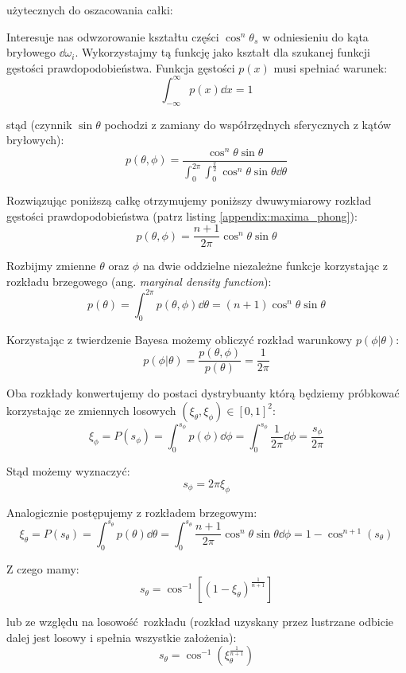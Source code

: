 \documentclass[../main.tex]{subfiles}
\begin{document}
\noindent użytecznych do oszacowania całki:

Interesuje nas odwzorowanie kształtu części $\cos^{n}\theta_s$ w odniesieniu do kąta bryłowego $\dd \omega_i$. Wykorzystajmy tą funkcję jako kształt dla szukanej funkcji gęstości prawdopodobieństwa. Funkcja gęstości $p(x)$ musi spełniać warunek:
\[ 
\int_{-\infty}^{\infty} p(x) \dd x = 1 
\]

\noindent stąd (czynnik $\sin\theta$ pochodzi z zamiany do współrzędnych sferycznych z kątów bryłowych):
\[
  p(\theta, \phi) = \frac{
    \cos^{n}{\theta} \sin\theta
  }{
    \int_{0}^{2\pi} \int_{0}^{\frac{\pi}{2}} {
      \cos^{n}{\theta} \sin\theta \dd \theta
    }
  }
\]

Rozwiązując poniższą całkę otrzymujemy poniższy dwuwymiarowy rozkład gęstości prawdopodobieństwa (patrz listing \ref{appendix:maxima_phong}):
\[
  p(\theta, \phi) =
    \frac{n+1}{2\pi} \cos^{n}\theta \sin\theta
\]

Rozbijmy zmienne $\theta$ oraz $\phi$ na dwie oddzielne niezależne funkcje korzystając z rozkładu brzegowego (ang. \textit{marginal density function}):
\[
  p(\theta) = \int_{0}^{2\pi} {
    p(\theta, \phi) \dd \theta
  } =
  (n+1) \cos^{n}{\theta} \sin\theta
\]

Korzystając z twierdzenie Bayesa możemy obliczyć rozkład warunkowy $p(\phi | \theta)$:
\[
  p(\phi | \theta) = \frac{
    p(\theta, \phi)
	}{
		p(\theta)
	} = \frac{1}{2\pi}
\]

Oba rozkłady konwertujemy do postaci dystrybuanty którą będziemy próbkować korzystając ze zmiennych losowych $(\xi_{\theta}, \xi_{\phi}) \in [0,1]^2$:
\[
	\xi_\phi = P(s_{\phi}) =
	\int_{0}^{s_{\phi}} {
		p(\phi) \dd \phi
	} =
	\int_{0}^{s_{\phi}} {
		\frac{1}{2\pi} \dd \phi
	} =
	\frac{s_{\phi}}{2\pi}
\]

Stąd możemy wyznaczyć:
\[
	s_{\phi} = 2 \pi \xi_{\phi}
\]

Analogicznie postępujemy z rozkładem brzegowym:
\[
  \xi_{\theta} = P(s_{\theta}) =
	\int_{0}^{s_{\theta}} {
		p(\theta) \dd \theta
	} =
	\int_{0}^{s_{\theta}} {
		\frac{n+1}{2\pi} \cos^{n}\theta \sin\theta \dd\phi
	} =
	1 - \cos^{n+1}(s_{\theta})
\]

Z czego mamy:
\[
	s_{\theta} =
	\cos^{-1}\left[
		(1 - \xi_{\theta})^{\frac{1}{n+1}}
	\right]
\]

lub ze względu na losowość rozkładu (rozkład uzyskany przez lustrzane odbicie dalej jest losowy i spełnia wszystkie założenia):
\[
	s_{\theta} =
	\cos^{-1}\left(
		\xi_{\theta}^{\frac{1}{n+1}}
	\right)
\]
\end{document}
